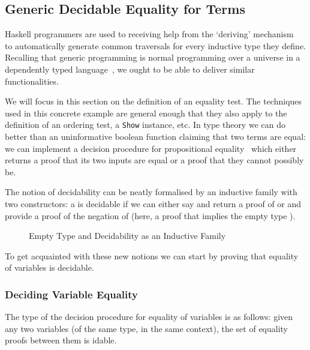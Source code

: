 \subsection{Generic Decidable Equality for Terms}

Haskell programmers are used to receiving help from the `deriving'
mechanism~\cite{DBLP:journals/entcs/HinzeJ00,DBLP:conf/haskell/MagalhaesDJL10}
to automatically generate common traversals for every inductive type
they define. Recalling that generic programming is normal programming
over a universe in a dependently typed
language~\cite{DBLP:conf/ifip2-1/AltenkirchM02}, we ought to be able to
deliver similar functionalities.

We will focus in this section on the definition of an equality test. The
techniques used in this concrete example are general enough that they also
apply to the definition of an ordering test, a \texttt{Show} instance, etc.
In type theory we can do better than an uninformative boolean function
claiming that two terms are equal: we can implement a decision procedure
for propositional equality~\cite{DBLP:conf/icfp/LohM11} which either
returns a proof that its two inputs are equal or a proof that they
cannot possibly be.

The notion of decidability can be neatly formalised by an inductive family
with two constructors: a   is decidable if we can either say
 and return a proof of  or  and provide a proof of
the negation of  (here, a proof that  implies the empty type
).

\begin{figure}[h]
\begin{minipage}[t]{0.45\textwidth}
\end{minipage}
\begin{minipage}[t]{0.45\textwidth}
\end{minipage}
\caption{Empty Type and Decidability as an Inductive Family}
\end{figure}

To get acquainted with these new notions we can start by proving that equality
of variables is decidable.

\subsubsection{Deciding Variable Equality}

The type of the decision procedure for equality of variables is as follows:
given any two variables (of the same type, in the same context), the set of
equality proofs between them is idable.

